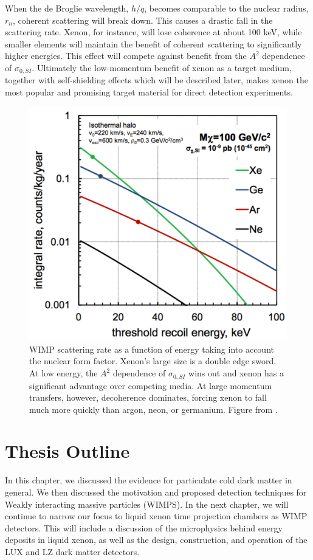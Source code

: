 When the de Broglie wavelength, $h/q$, becomes comparable to the nuclear radius, $r_n$, coherent scattering will break down. This causes a drastic fall in the scattering rate. Xenon, for instance, will lose coherence at about 100 keV, while smaller elements will maintain the benefit of coherent scattering to significantly higher energies. This effect will compete against benefit from the $A^2$ dependence of $\sigma_{0,SI}$. Ultimately the low-momentum benefit of xenon as a target medium, together with self-shielding effects which will be described later, makes xenon the most popular and promising target material for direct detection experiments.
\begin{figure}[h!]
\centering
\includegraphics[width=150mm]{Figures/recoil_spec.pdf}
\caption{WIMP scattering rate as a function of energy taking into account the nuclear form factor. Xenon's large size is a double edge sword. At low energy, the $A^2$ dependence of $\sigma_{0,SI}$ wins out and xenon has a significant advantage over competing media. At large momentum transfers, however, decoherence dominates, forcing xenon to fall much more quickly than argon, neon, or germanium. Figure from \cite{henriquae}.}
\label{fig:helm} 
\end{figure}




\section{Thesis Outline}
In this chapter, we discussed the evidence for particulate cold dark matter in general. We then discussed the motivation and proposed detection techniques for Weakly interacting massive particles (WIMPS). In the next chapter, we will continue to narrow our focus to liquid xenon time projection chambers as WIMP detectors. This will include a discussion of the microphysics behind energy deposits in liquid xenon, as well as the design, construction, and operation of the LUX and LZ dark matter detectors.

